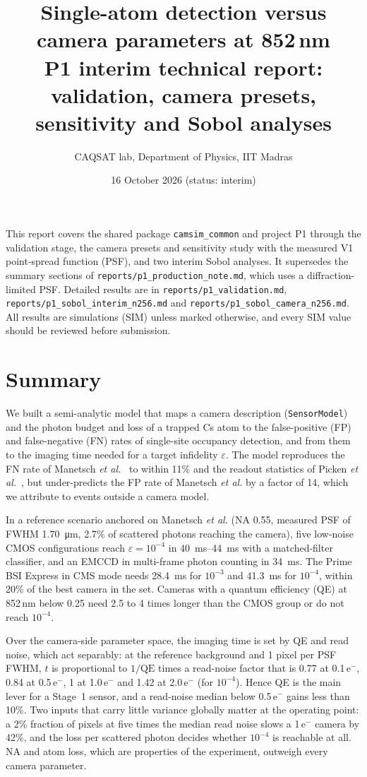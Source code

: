 \documentclass[11pt,a4paper]{article}
\title{Single-atom detection versus camera parameters at 852\,nm\\[4pt]
\large P1 interim technical report: validation, camera presets, sensitivity and Sobol analyses}
\author{CAQSAT lab, Department of Physics, IIT Madras}
\date{16 October 2026 \quad (status: interim)}
\newcommand{\eps}{\varepsilon}
\newcommand{\file}[1]{\nolinkurl{#1}}
\newcommand{\elec}{e$^-$}
\begin{document}
\maketitle

\noindent This report covers the shared package \file{camsim_common} and project P1 through the
validation stage, the camera presets and sensitivity study with the measured V1 point-spread function
(PSF), and two interim Sobol analyses. It supersedes the summary sections of
\file{reports/p1_production_note.md}, which uses a diffraction-limited PSF. Detailed results are in
\file{reports/p1_validation.md}, \file{reports/p1_sobol_interim_n256.md} and
\file{reports/p1_sobol_camera_n256.md}. All results are simulations (SIM) unless marked otherwise, and
every SIM value should be reviewed before submission.

\section*{Summary}

We built a semi-analytic model that maps a camera description (\file{SensorModel}) and the photon
budget and loss of a trapped Cs atom to the false-positive (FP) and false-negative (FN) rates of
single-site occupancy detection, and from them to the imaging time needed for a target infidelity
$\eps$. The model reproduces the FN rate of Manetsch \textit{et al.}~\cite{manetsch} to within 11\% and
the readout statistics of Picken \textit{et al.}~\cite{picken}, but under-predicts the FP rate of
Manetsch \textit{et al.} by a factor of 14, which we attribute to events outside a camera model.

In a reference scenario anchored on Manetsch \textit{et al.} (NA 0.55, measured PSF of FWHM
\SI{1.70}{\micro\metre}, 2.7\% of scattered photons reaching the camera), five low-noise CMOS
configurations reach $\eps = 10^{-4}$ in \SIrange{40}{44}{\milli\second} with a matched-filter
classifier, and an EMCCD in multi-frame photon counting in \SI{34}{\milli\second}. The Prime BSI Express
in CMS mode needs \SI{28.4}{\milli\second} for $10^{-3}$ and \SI{41.3}{\milli\second} for $10^{-4}$,
within 20\% of the best camera in the set. Cameras with a quantum efficiency (QE) at 852\,nm below 0.25
need 2.5 to 4 times longer than the CMOS group or do not reach $10^{-4}$.

Over the camera-side parameter space, the imaging time is set by QE and read noise, which act
separably: at the reference background and 1 pixel per PSF FWHM, $t$ is proportional to $1/\mathrm{QE}$
times a read-noise factor that is 0.77 at 0.1\,\elec, 0.84 at 0.5\,\elec, 1 at 1.0\,\elec{} and 1.42 at
2.0\,\elec{} (for $10^{-4}$). Hence QE is the main lever for a Stage~1 sensor, and a read-noise median
below 0.5\,\elec{} gains less than 10\%. Two inputs that carry little variance globally matter at the
operating point: a 2\% fraction of pixels at five times the median read noise slows a 1\,\elec{} camera
by 42\%, and the loss per scattered photon decides whether $10^{-4}$ is reachable at all. NA and atom
loss, which are properties of the experiment, outweigh every camera parameter.
\end{document}
